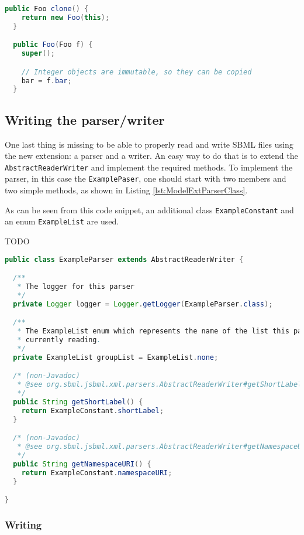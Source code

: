 \begin{lstlisting}[language=Java,caption={Example of the \texttt{clone} method for the \texttt{Foo} class},label={lst:ModelExtCloneFoo}]
  public Foo clone() {
    return new Foo(this);
  }

  public Foo(Foo f) {
    super();

    // Integer objects are immutable, so they can be copied
    bar = f.bar;
  }
\end{lstlisting}


\subsection{Writing the parser/writer}

One last thing is missing to be able to properly read and write SBML files using the new extension: a parser and a writer.
An easy way to do that is to extend the \texttt{AbstractReaderWriter} and implement the required methods.
To implement the parser, in this case the \texttt{ExamplePaser}, one should start with two members and two simple methods, as shown in Listing \ref{lst:ModelExtParserClass}.

As can be seen from this code snippet, an additional class \texttt{ExampleConstant} and an enum \texttt{ExampleList} are used.

TODO


\begin{lstlisting}[language=Java,caption={The first part of the parser for the extension},label={lst:ModelExtParserClass}]
public class ExampleParser extends AbstractReaderWriter {

  /**
   * The logger for this parser
   */
  private Logger logger = Logger.getLogger(ExampleParser.class);

  /**
   * The ExampleList enum which represents the name of the list this parser is
   * currently reading.
   */
  private ExampleList groupList = ExampleList.none;

  /* (non-Javadoc)
   * @see org.sbml.jsbml.xml.parsers.AbstractReaderWriter#getShortLabel()
   */
  public String getShortLabel() {
    return ExampleConstant.shortLabel;
  }

  /* (non-Javadoc)
   * @see org.sbml.jsbml.xml.parsers.AbstractReaderWriter#getNamespaceURI()
   */
  public String getNamespaceURI() {
    return ExampleConstant.namespaceURI;
  }

}
\end{lstlisting}


\subsubsection{Writing}

